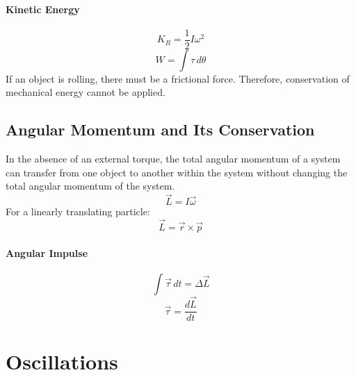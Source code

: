 \documentclass{article}
\begin{document}
            \paragraph{Kinetic Energy}
            \begin{equation}
                K_R = \frac{1}{2} I \omega^2
            \end{equation}
            \begin{equation}
                W = \int \tau \, d\theta
            \end{equation}
            If an object is rolling, there must be a frictional force. Therefore, conservation of mechanical energy cannot be applied.

        \subsection{Angular Momentum and Its Conservation}
            In the absence of an external torque, the total angular momentum of a system can transfer from one object to another within the system without changing the total angular momentum of the system.
            \begin{equation}
                \vec{L} = I \vec{\omega}
            \end{equation}
            For a linearly translating particle:
            \begin{equation}
                \vec{L} = \vec{r} \times \vec{p}
            \end{equation}

            \paragraph{Angular Impulse}
            \begin{equation}
                \int \vec{\tau} \, dt = \Delta \vec{L}
            \end{equation}
            \begin{equation}
                \vec{\tau} = \frac{d\vec{L}}{dt}
            \end{equation}

    \section{Oscillations}
\end{document}
